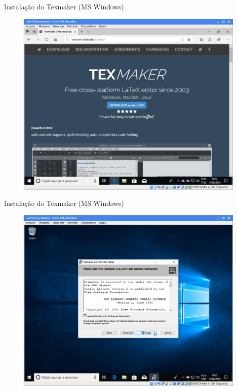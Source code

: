 \documentclass{beamer}
\begin{document}
\begin{frame}{Instala\c{c}\~ao do Texmaker (MS Windows)}
    \begin{figure}[h]
        \includegraphics[scale=0.25]{fig/texmaker-site.png}
    \end{figure}
\end{frame}

\begin{frame}{Instala\c{c}\~ao do Texmaker (MS Windows)}
    \begin{figure}[h]
        \includegraphics[scale=0.25]{fig/texmaker-01.png}
    \end{figure}
\end{frame}
\end{document}
